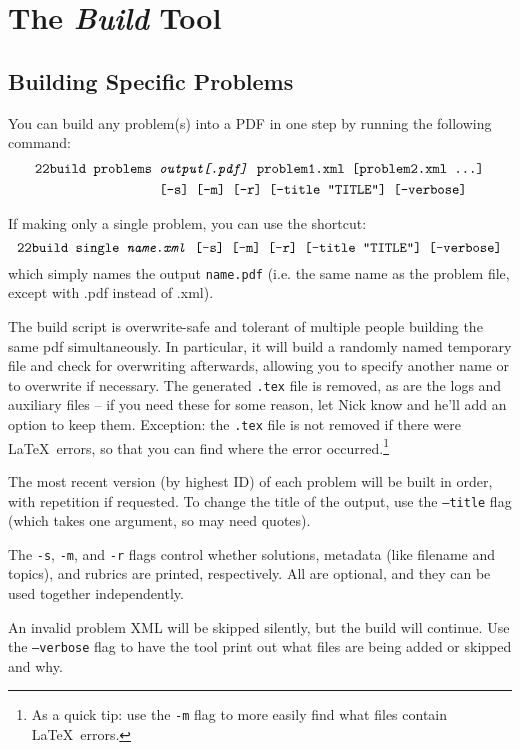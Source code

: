 \section{The \textit{Build} Tool}
  \subsection{Building Specific Problems}
    You can build any problem(s) into a PDF in one step by running the 
    following command:
    \begin{align*}\texttt{22build }\texttt{problems }&\texttt{\textit{output[.pdf]} problem1.xml [problem2.xml \dots]}\\
        ~&\texttt{[-s] [-m] [-r] [--title ``TITLE''] [--verbose]}\end{align*}
        
    If making only a single problem, you can use the shortcut:
    \[\texttt{22build }\texttt{single \textit{name.xml} 
        [-s] [-m] [-r] [--title ``TITLE''] [--verbose]}\]
    which simply names the output \texttt{name.pdf} (i.e. the same name as 
    the problem file, except with .pdf instead of .xml).
    
    The build script is overwrite-safe and tolerant of multiple people 
    building the same pdf simultaneously. In particular, it will build a 
    randomly named temporary file and check for overwriting afterwards, 
    allowing you to specify another name or to overwrite if necessary. The 
    generated \texttt{.tex} file is removed, as are the logs and auxiliary 
    files -- if you need these for some reason, let Nick know and he'll 
    add an option to keep them. Exception: the \texttt{.tex} file is not 
    removed if there were \LaTeX\ errors, so that you can find where the 
    error occurred.\footnote{As a quick tip: use the \texttt{-m} flag to 
    more easily find what files contain \LaTeX\ errors.}
    
    The most recent version (by highest ID) of each problem will be built 
    in order, with repetition if requested. To change the 
    title of the output, use the \texttt{--title} flag (which takes one 
    argument, so may need quotes).
    
    The \texttt{-s}, \texttt{-m}, and \texttt{-r} flags control whether 
    solutions, metadata (like filename and topics), and rubrics are 
    printed, respectively. All are optional, and they can be used together 
    independently.
    
    An invalid problem XML will be skipped silently, but the build will
    continue. Use the \texttt{--verbose} flag to have the tool print out 
    what files are being added or skipped and why.
